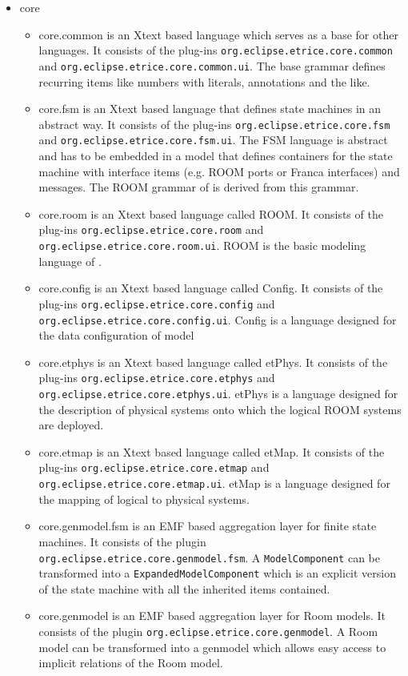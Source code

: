 \begin{itemize}
\item core

\begin{itemize}
\item core.common is an Xtext based language which serves as a base for other \eTrice{} languages.
It consists of the plug-ins
\texttt{org.eclipse.etrice.core.common} and
\texttt{org.eclipse.etrice.core.common.ui}.
The base grammar defines recurring items like numbers with literals, annotations and the like.
\item core.fsm is an Xtext based language that defines state machines in an abstract way.
It consists of the plug-ins
\texttt{org.eclipse.etrice.core.fsm} and
\texttt{org.eclipse.etrice.core.fsm.ui}.
The FSM language is abstract and has to be embedded in a model that defines containers for the state machine
with interface items (e.g. ROOM ports or Franca interfaces) and messages.
The ROOM grammar of \eTrice{} is derived from this grammar.
\item core.room is an Xtext based language called ROOM. It consists of the plug-ins
\texttt{org.eclipse.etrice.core.room} and
\texttt{org.eclipse.etrice.core.room.ui}. ROOM is the basic modeling language of \eTrice{}.
\item core.config is an Xtext based language called Config. It consists of the plug-ins
\texttt{org.eclipse.etrice.core.config} and
\texttt{org.eclipse.etrice.core.config.ui}. Config is a language designed for the data configuration of model 
\item core.etphys is an Xtext based language called etPhys. It consists of the plug-ins
\texttt{org.eclipse.etrice.core.etphys} and
\texttt{org.eclipse.etrice.core.etphys.ui}. etPhys is a language designed for the description of physical systems
onto which the logical ROOM systems are deployed.
\item core.etmap is an Xtext based language called etMap. It consists of the plug-ins
\texttt{org.eclipse.etrice.core.etmap} and
\texttt{org.eclipse.etrice.core.etmap.ui}. etMap is a language designed for the mapping of logical
to physical systems.
\item core.genmodel.fsm is an EMF based aggregation layer for finite state machines. It consists of the plugin 
\texttt{org.eclipse.etrice.core.genmodel.fsm}. A \texttt{ModelComponent} can be transformed into a \texttt{ExpandedModelComponent} which is an
explicit version of the state machine with all the inherited items contained.
\item core.genmodel is an EMF based aggregation layer for Room models. It consists of the plugin 
\texttt{org.eclipse.etrice.core.genmodel}. A Room model can be transformed into a genmodel which allows 
easy access to implicit relations of the Room model.
\end{itemize}


\end{itemize}
